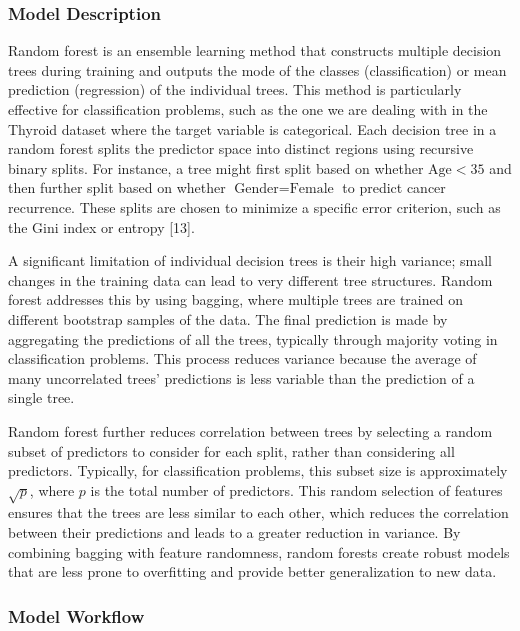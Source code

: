 \documentclass[
  letterpaper,
  DIV=11,
  numbers=noendperiod]{scrartcl}
\begin{document}
\subsubsection{Model Description}\label{model-description-5}

Random forest is an ensemble learning method that constructs multiple
decision trees during training and outputs the mode of the classes
(classification) or mean prediction (regression) of the individual
trees. This method is particularly effective for classification
problems, such as the one we are dealing with in the Thyroid dataset
where the target variable is categorical. Each decision tree in a random
forest splits the predictor space into distinct regions using recursive
binary splits. For instance, a tree might first split based on whether
\(\text{Age}<35\) and then further split based on whether
\(\text{Gender}=\text{Female}\) to predict cancer recurrence. These
splits are chosen to minimize a specific error criterion, such as the
Gini index or entropy {[}13{]}.

A significant limitation of individual decision trees is their high
variance; small changes in the training data can lead to very different
tree structures. Random forest addresses this by using bagging, where
multiple trees are trained on different bootstrap samples of the data.
The final prediction is made by aggregating the predictions of all the
trees, typically through majority voting in classification problems.
This process reduces variance because the average of many uncorrelated
trees' predictions is less variable than the prediction of a single
tree.

Random forest further reduces correlation between trees by selecting a
random subset of predictors to consider for each split, rather than
considering all predictors. Typically, for classification problems, this
subset size is approximately \(\sqrt{p}\), where \(p\) is the total
number of predictors. This random selection of features ensures that the
trees are less similar to each other, which reduces the correlation
between their predictions and leads to a greater reduction in variance.
By combining bagging with feature randomness, random forests create
robust models that are less prone to overfitting and provide better
generalization to new data.

\subsubsection{Model Workflow}\label{model-workflow-5}
\end{document}
